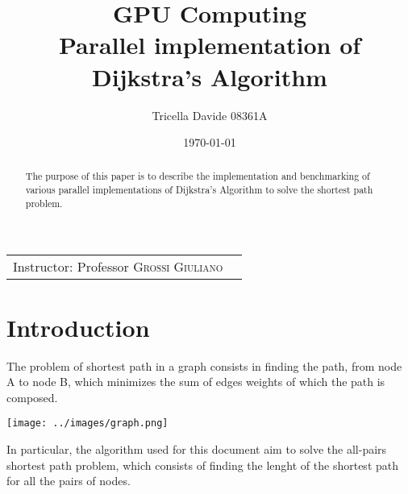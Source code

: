 \documentclass[
	a4paper, %
	12pt, %
]{class}
\title{GPU Computing\\Parallel implementation of Dijkstra's Algorithm} %
\author{Tricella Davide 08361A} %
\date{\today} %
\begin{document}
\maketitle %

\begin{center}
    \begin{tabular}{l r}
        Instructor: Professor \textsc{Grossi Giuliano}
    \end{tabular}
\end{center}


\begin{abstract}
    The purpose of this paper is to describe the implementation and benchmarking of various parallel implementations of Dijkstra's Algorithm to solve the shortest path problem.
\end{abstract}


\tableofcontents


\section{Introduction}

The problem of shortest path in a graph consists in finding the path, from node A to node B,
which minimizes the sum of edges weights of which the path is composed.\\

\begin{center}
    \texttt{[image: ../images/graph.png]}
\end{center}

In particular, the algorithm used for this document aim to solve the all-pairs shortest path problem,
which consists of finding the lenght of the shortest path for all the pairs of nodes.\\
\end{document}
